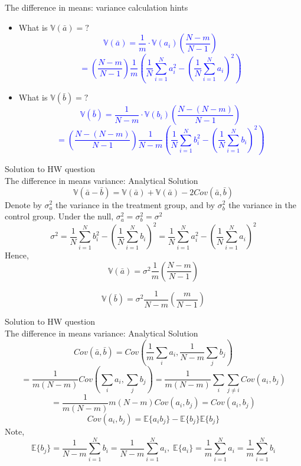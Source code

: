 \documentclass{beamer}
\theoremstyle{definition}
\begin{document}
\begin{frame}{The difference in means: variance calculation hints}
\begin{itemize}

\item What is $\mathbb{V}(\bar{a})=?$\\ \pause 
\textcolor{blue}{$$\mathbb{V}(\bar{a}) = \frac{1}{m} \cdot \mathbb{V}(a_i)
\left( \frac{N-m}{N-1} \right)$$
$$ = \left( \frac{N-m}{N-1} \right) \frac{1}{m} \left( \frac{1}{N} \sum_{i=1}^N a_i^2 - \left( \frac{1}{N} \sum_{i=1}^N a_i \right)^2 \right)$$}

\item What is $\mathbb{V}(\bar{b})=?$\\ \pause 
\textcolor{blue}{$$\mathbb{V}(\bar{b}) = \frac{1}{N-m} \cdot \mathbb{V}(b_i)
\left( \frac{N - (N-m)}{N-1} \right)$$
$$ = \left( \frac{N - (N-m)}{N-1} \right) \frac{1}{N-m} \left( \frac{1}{N} \sum_{i=1}^N b_i^2 - \left( \frac{1}{N} \sum_{i=1}^N b_i \right)^2 \right)$$}
\end{itemize}
\end{frame}



\begin{frame}{Solution to HW question \\ 
The difference in means variance: Analytical Solution}
$$\mathbb{V} \left( \bar{a} - \bar{b} \right)
 = \mathbb{V} \left( \bar{a} \right) + \mathbb{V} \left( \bar{a} \right) 
-2Cov(\bar{a},\bar{b})$$
\pause
Denote by $\sigma^2_a$ the variance in the treatment group, and by $\sigma^2_b$ the variance in the control group. Under the null, $\sigma^2_a = \sigma^2_b = \sigma^2$
$$ \sigma^2 = 
\frac{1}{N} \sum_{i=1}^N b_i^2 - \left( \frac{1}{N} \sum_{i=1}^N b_i \right)^2 = 
\frac{1}{N} \sum_{i=1}^N a_i^2 - \left( \frac{1}{N} \sum_{i=1}^N a_i \right)^2$$
Hence, \pause
$$\mathbb{V} \left( \bar{a} \right) = \sigma^2 \frac{1}{m} \left( \frac{N - m}{N-1} \right)$$

$$\mathbb{V} \left( \bar{b} \right) = \sigma^2 \frac{1}{N-m} \left( \frac{m}{N-1} \right)$$
\end{frame}

\begin{frame}{Solution to HW question \\ 
The difference in means variance: Analytical Solution}
$$Cov(\bar{a},\bar{b}) = Cov(\frac{1}{m} \sum_i a_i,\frac{1}{N-m} \sum_j b_j)$$
$$= \frac{1}{m(N-m)} Cov(\sum_i a_i,\sum_j b_j) = 
\frac{1}{m(N-m)} \sum_i \sum_{j\neq i} Cov( a_i, b_j)$$
\pause
$$ = \frac{1}{m(N-m)} m(N-m) Cov( a_i, b_j) = Cov( a_i, b_j)$$
$$ Cov( a_i, b_j) = \mathbb{E}\lbrace a_i b_j \rbrace - 
\mathbb{E}\lbrace b_j \rbrace \mathbb{E}\lbrace b_j \rbrace $$
Note,\pause
$$\mathbb{E}\lbrace b_j \rbrace = \frac{1}{N-m} \sum_{i=1}^N b_i = \frac{1}{N-m} \sum_{i=1}^N a_i, \;
\mathbb{E}\lbrace a_i \rbrace = \frac{1}{m} \sum_{i=1}^N a_i = \frac{1}{m} \sum_{i=1}^N b_i$$
\end{frame}
\end{document}
